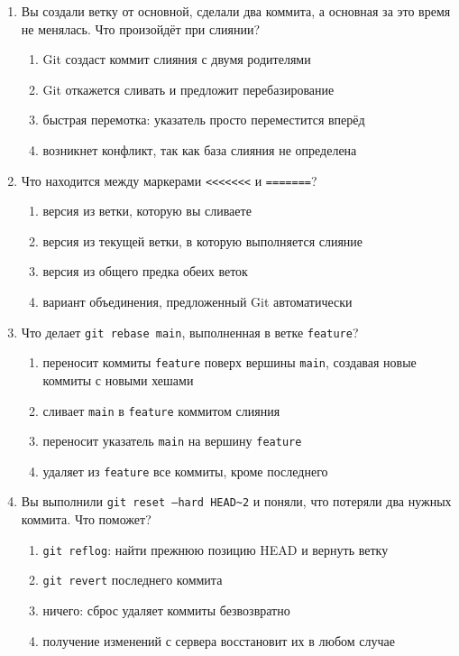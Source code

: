 \begin{enumerate}
\item Вы создали ветку от основной, сделали два коммита, а основная за это
      время не менялась. Что произойдёт при слиянии?
  \begin{enumerate}
    \item[а)] Git создаст коммит слияния с двумя родителями
    \item[б)] Git откажется сливать и предложит перебазирование
    \item[в)] быстрая перемотка: указатель просто переместится вперёд
    \item[г)] возникнет конфликт, так как база слияния не определена
  \end{enumerate}

\item Что находится между маркерами \texttt{<<<<<<<} и \texttt{=======}?
  \begin{enumerate}
    \item[а)] версия из ветки, которую вы сливаете
    \item[б)] версия из текущей ветки, в которую выполняется слияние
    \item[в)] версия из общего предка обеих веток
    \item[г)] вариант объединения, предложенный Git автоматически
  \end{enumerate}

\item Что делает \texttt{git rebase main}, выполненная в ветке
      \texttt{feature}?
  \begin{enumerate}
    \item[а)] переносит коммиты \texttt{feature} поверх вершины \texttt{main},
      создавая новые коммиты с новыми хешами
    \item[б)] сливает \texttt{main} в \texttt{feature} коммитом слияния
    \item[в)] переносит указатель \texttt{main} на вершину \texttt{feature}
    \item[г)] удаляет из \texttt{feature} все коммиты, кроме последнего
  \end{enumerate}

\item Вы выполнили \texttt{git reset --hard HEAD\textasciitilde 2} и поняли,
      что потеряли два нужных коммита. Что поможет?
  \begin{enumerate}
    \item[а)] \texttt{git reflog}: найти прежнюю позицию HEAD и вернуть ветку
    \item[б)] \texttt{git revert} последнего коммита
    \item[в)] ничего: сброс удаляет коммиты безвозвратно
    \item[г)] получение изменений с сервера восстановит их в любом случае
  \end{enumerate}


\end{enumerate}

